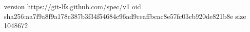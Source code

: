 version https://git-lfs.github.com/spec/v1
oid sha256:aa7f9a8f9a178c387b3f34f54684c96ad9ceaffbcac8e57fc03cb920de821b8e
size 1048672
